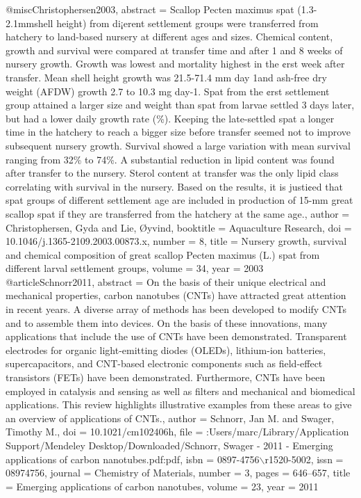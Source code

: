 @misc{Christophersen2003,
abstract = {Scallop Pecten maximus spat (1.3-2.1mmshell height) from di¡erent settlement groups were transferred from hatchery to land-based nursery at different ages and sizes. Chemical content, growth and survival were compared at transfer time and after 1 and 8 weeks of nursery growth. Growth was lowest and mortality highest in the ¢rst week after transfer. Mean shell height growth was 21.5-71.4 mm day 1and ash-free dry weight (AFDW) growth 2.7 to 10.3 mg day-1. Spat from the ¢rst settlement group attained a larger size and weight than spat from larvae settled 3 days later, but had a lower daily growth rate ({\%}). Keeping the late-settled spat a longer time in the hatchery to reach a bigger size before transfer seemed not to improve subsequent nursery growth. Survival showed a large variation with mean survival ranging from 32{\%} to 74{\%}. A substantial reduction in lipid content was found after transfer to the nursery. Sterol content at transfer was the only lipid class correlating with survival in the nursery. Based on the results, it is justi¢ed that spat groups of different settlement age are included in production of 15-mm great scallop spat if they are transferred from the hatchery at the same age.},
author = {Christophersen, Gyda and Lie, {\O}yvind},
booktitle = {Aquaculture Research},
doi = {10.1046/j.1365-2109.2003.00873.x},
number = {8},
title = {{Nursery growth, survival and chemical composition of great scallop Pecten maximus (L.) spat from different larval settlement groups}},
volume = {34},
year = {2003}
}
@article{Schnorr2011,
abstract = {On the basis of their unique electrical and mechanical properties, carbon nanotubes (CNTs) have attracted great attention in recent years. A diverse array of methods has been developed to modify CNTs and to assemble them into devices. On the basis of these innovations, many applications that include the use of CNTs have been demonstrated. Transparent electrodes for organic light-emitting diodes (OLEDs), lithium-ion batteries, supercapacitors, and CNT-based electronic components such as field-effect transistors (FETs) have been demonstrated. Furthermore, CNTs have been employed in catalysis and sensing as well as filters and mechanical and biomedical applications. This review highlights illustrative examples from these areas to give an overview of applications of CNTs.},
author = {Schnorr, Jan M. and Swager, Timothy M.},
doi = {10.1021/cm102406h},
file = {:Users/marc/Library/Application Support/Mendeley Desktop/Downloaded/Schnorr, Swager - 2011 - Emerging applications of carbon nanotubes.pdf:pdf},
isbn = {0897-4756$\backslash$r1520-5002},
issn = {08974756},
journal = {Chemistry of Materials},
number = {3},
pages = {646--657},
title = {{Emerging applications of carbon nanotubes}},
volume = {23},
year = {2011}
}
